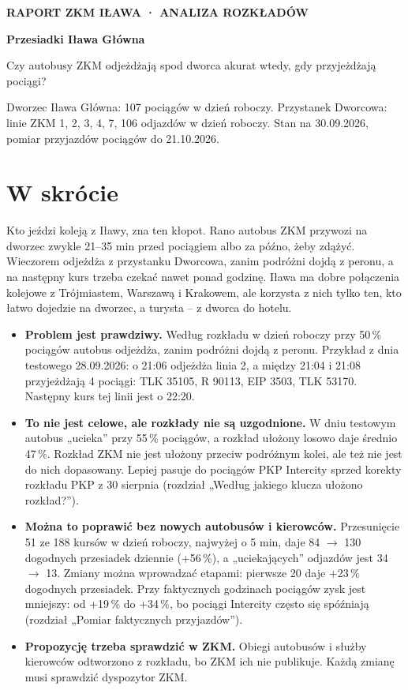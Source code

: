 \documentclass[10pt,a4paper]{article}
\newcommand{\mut}[1]{\textcolor{muted}{#1}}
\begin{document}
{\sffamily\footnotesize\bfseries\MakeUppercase{Raport ZKM Iława · analiza rozkładów}}\par\smallskip
{\sffamily\LARGE\bfseries Przesiadki Iława Główna}\par\medskip
{\large Czy autobusy ZKM odjeżdżają spod dworca akurat wtedy, gdy przyjeżdżają pociągi?}\par\medskip
{\small\mut{Dworzec Iława Główna: 107 pociągów w dzień roboczy. Przystanek Dworcowa: linie ZKM 1, 2, 3, 4, 7, 106 odjazdów w dzień roboczy. Stan na 30.09.2026, pomiar przyjazdów pociągów do 21.10.2026.}}\par\bigskip
\section*{W skrócie}
Kto jeździ koleją z Iławy, zna ten kłopot. Rano autobus ZKM przywozi na dworzec zwykle 21--35 min przed pociągiem albo za późno, żeby zdążyć. Wieczorem odjeżdża z przystanku Dworcowa, zanim podróżni dojdą z peronu, a na następny kurs trzeba czekać nawet ponad godzinę. Iława ma dobre połączenia kolejowe z Trójmiastem, Warszawą i Krakowem, ale korzysta z nich tylko ten, kto łatwo dojedzie na dworzec, a turysta -- z dworca do hotelu.

\begin{itemize}
\item \textbf{Problem jest prawdziwy.} Według rozkładu w dzień roboczy przy 50\,\% pociągów autobus odjeżdża, zanim podróżni dojdą z peronu. Przykład z dnia testowego 28.09.2026: o 21:06 odjeżdża linia 2, a między 21:04 i 21:08 przyjeżdżają 4 pociągi: TLK 35105, R 90113, EIP 3503, TLK 53170. Następny kurs tej linii jest o 22:20.
\item \textbf{To nie jest celowe, ale rozkłady nie są uzgodnione.} W dniu testowym autobus „ucieka” przy 55\,\% pociągów, a rozkład ułożony losowo daje średnio 47\,\%. Rozkład ZKM nie jest ułożony przeciw podróżnym kolei, ale też nie jest do nich dopasowany. Lepiej pasuje do pociągów PKP Intercity sprzed korekty rozkładu PKP z 30 sierpnia (rozdział „Według jakiego klucza ułożono rozkład?”).
\item \textbf{Można to poprawić bez nowych autobusów i kierowców.} Przesunięcie 51 ze 188 kursów w dzień roboczy, najwyżej o 5 min, daje 84 $\to$ 130 dogodnych przesiadek dziennie (+56\,\%), a „uciekających” odjazdów jest 34 $\to$ 13. Zmiany można wprowadzać etapami: pierwsze 20 daje +23\,\% dogodnych przesiadek. Przy faktycznych godzinach pociągów zysk jest mniejszy: od +19\,\% do +34\,\%, bo pociągi Intercity często się spóźniają (rozdział „Pomiar faktycznych przyjazdów”).
\item \textbf{Propozycję trzeba sprawdzić w ZKM.} Obiegi autobusów i służby kierowców odtworzono z rozkładu, bo ZKM ich nie publikuje. Każdą zmianę musi sprawdzić dyspozytor ZKM.
\end{itemize}
\end{document}

